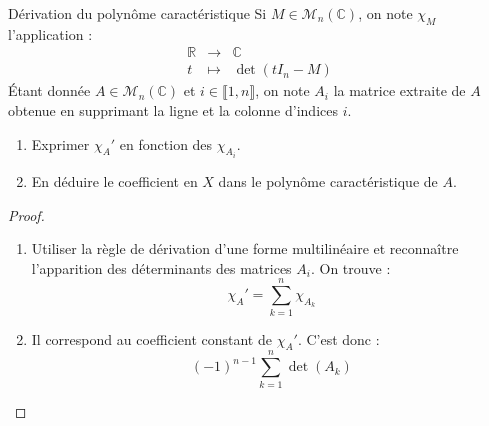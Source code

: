 \documentclass[french,a4paper]{article}
\newcommand{\R}{\mathbb{R}}
\newcommand{\C}{\mathbb{C}}
\theoremstyle{plain}
\theoremstyle{definition}
\theoremstyle{remark}
\begin{document}
\begin{ex}[Moulin.FV.12]{Dérivation du polynôme caractéristique}
	Si $M\in\mathcal{M}_n(\C)$, on note $\chi_M$ l'application : $$\begin{array}{rcl}
		\R&\longrightarrow&\C\\
		t&\longmapsto&\det(tI_n-M)
	\end{array}$$ Étant donnée $A\in\mathcal{M}_n(\C)$ et $i\in\llbracket1,n\rrbracket$, on note $A_i$ la matrice extraite de $A$ obtenue en supprimant la ligne et la colonne d'indices $i$.
	\begin{enumerate}
		\item Exprimer $\chi_A'$ en fonction des $\chi_{A_i}$.
		\item En déduire le coefficient en $X$ dans le polynôme caractéristique de $A$.
	\end{enumerate}
\end{ex}
\begin{proof}
	\begin{enumerate}
		\item Utiliser la règle de dérivation d'une forme multilinéaire et reconnaître l'apparition des déterminants des matrices $A_i$. On trouve : $$\chi_A'=\sum_{k=1}^{n}\chi_{A_k}$$
		\item Il correspond au coefficient constant de $\chi_A'$. C'est donc : $$(-1)^{n-1}\sum_{k=1}^{n}\det(A_k)$$
	\end{enumerate}
\end{proof}
\end{document}
